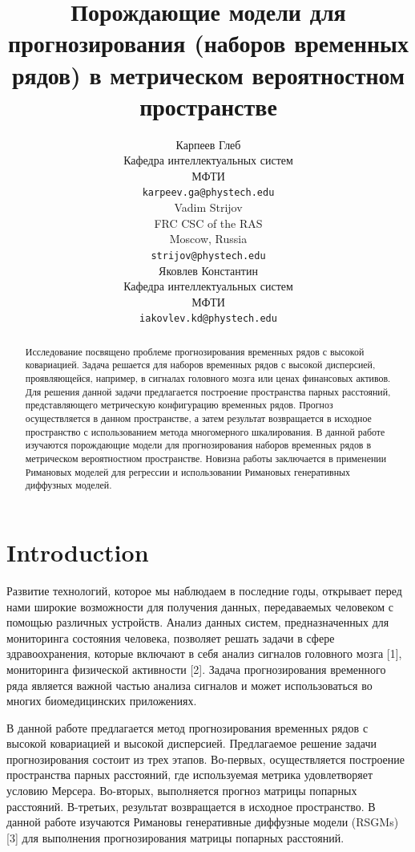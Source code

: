 \documentclass{article}
\title{Порождающие модели для прогнозирования (наборов временных рядов) в метрическом вероятностном пространстве}
\author{ Карпеев Глеб \\
	Кафедра интеллектуальных систем\\
	МФТИ\\
	\texttt{karpeev.ga@phystech.edu} \\
	\And
	Vadim Strijov \\
	FRC CSC of the RAS\\
	Moscow, Russia\\
        \texttt{strijov@phystech.edu} \\
        \And
	Яковлев Константин \\
	Кафедра интеллектуальных систем\\
	МФТИ\\
	\texttt{iakovlev.kd@phystech.edu} \\
}
\date{}
\begin{document}
\maketitle

\begin{abstract}
	Исследование посвящено проблеме прогнозирования временных рядов с высокой ковариацией. Задача решается для наборов временных рядов с высокой дисперсией, проявляющейся, например, в сигналах головного мозга или ценах финансовых активов. Для решения данной задачи предлагается построение пространства парных расстояний, представляющего метрическую конфигурацию временных рядов. Прогноз осуществляется в данном пространстве, а затем результат возвращается в исходное пространство с использованием метода многомерного шкалирования. В данной работе изучаются порождающие модели для прогнозирования наборов временных рядов в метрическом вероятностном пространстве. Новизна работы заключается в применении Римановых моделей для регрессии и использовании Римановых генеративных диффузных моделей.

\end{abstract}



\section{Introduction}
Развитие технологий, которое мы наблюдаем в последние годы, открывает перед нами широкие возможности для получения данных, передаваемых человеком с помощью различных устройств. Анализ данных систем, предназначенных для мониторинга состояния человека, позволяет решать задачи в сфере здравоохранения, которые включают в себя анализ сигналов головного мозга [1], мониторинга физической активности [2]. Задача прогнозирования временного ряда является важной частью анализа сигналов и может использоваться во многих биомедицинских приложениях.

В данной работе предлагается метод прогнозирования временных рядов с высокой ковариацией и высокой дисперсией. Предлагаемое решение задачи прогнозирования состоит из трех этапов. Во-первых, осуществляется построение пространства парных расстояний, где используемая метрика удовлетворяет условию Мерсера. Во-вторых, выполняется прогноз матрицы попарных расстояний. В-третьих, результат возвращается в исходное пространство.  В данной работе изучаются Римановы генеративные диффузные модели (RSGMs) [3] для выполнения прогнозирования матрицы попарных расстояний.
\end{document}
